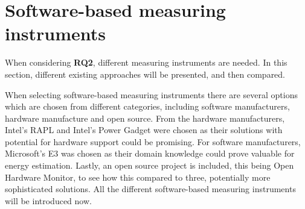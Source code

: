 \section{Software-based measuring instruments}\label{sec:measuring_instruments}

When considering \textbf{RQ2}, different measuring instruments are needed. In this section, different existing approaches will be presented, and then compared.

When selecting software-based measuring instruments there are several options which are chosen from different categories, including software manufacturers, hardware manufacture and open source. From the hardware manufacturers, Intel's RAPL and Intel's Power Gadget were chosen as their solutions with potential for hardware support could be promising. For software manufacturers, Microsoft's E3 was chosen as their domain knowledge could prove valuable for energy estimation. Lastly, an open source project is included, this being Open Hardware Monitor, to see how this compared to three, potentially more sophisticated solutions. All the different software-based measuring instruments will be introduced now.





